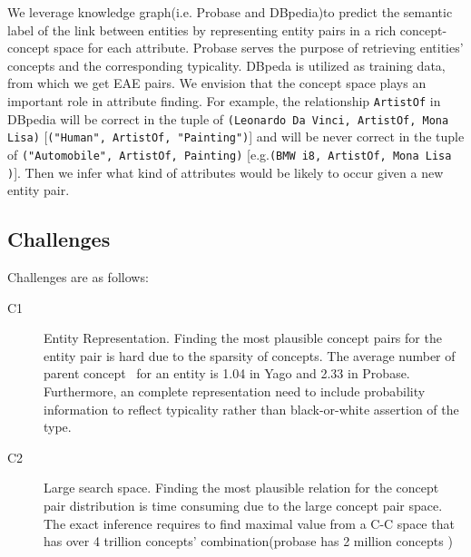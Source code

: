 We leverage knowledge graph(i.e. \ac{Probase} and \ac{DBpedia})to predict the semantic label of the link between entities by representing entity pairs in a rich concept-concept space for each attribute.
\ac{Probase} serves the purpose of retrieving entities' concepts and the corresponding typicality.
\ac{DBpeda} is utilized as training data, from which we get EAE pairs.
We envision that the concept space plays an important role in attribute finding.
For example, the relationship {\tt ArtistOf} in \ac{DBpedia} will be correct in the tuple of {\tt(Leonardo Da Vinci, ArtistOf, Mona Lisa)} [{\tt("Human", ArtistOf, "Painting")}] and will be never correct in the tuple of {\tt ("Automobile", ArtistOf, Painting)} [e.g.{\tt(BMW i8, ArtistOf, Mona Lisa )}].
Then we infer what kind of attributes would be likely to occur given a new entity pair.

\subsection{Challenges}
Challenges are as follows:
\begin{description}
  \item[C1] Entity Representation.
  Finding the most plausible concept pairs for the entity pair is hard due to the sparsity of concepts.
  The average number of parent concept~\cite{wu2012probase} for an entity is 1.04 in Yago and 2.33 in Probase.
  Furthermore, an complete representation need to include probability information to reflect typicality rather than black-or-white assertion of the type.
  \item[C2] Large search space.
  Finding the most plausible relation for the concept pair distribution is time consuming due to the large concept pair space.
  The exact inference requires to find maximal value from a C-C space that has over 4 trillion concepts' combination(probase has 2 million concepts )
\end{description}




